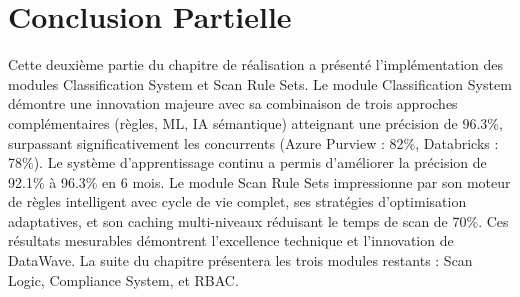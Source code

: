 \section*{Conclusion Partielle}

Cette deuxième partie du chapitre de réalisation a présenté l'implémentation des modules Classification System et Scan Rule Sets. Le module Classification System démontre une innovation majeure avec sa combinaison de trois approches complémentaires (règles, ML, IA sémantique) atteignant une précision de 96.3\%, surpassant significativement les concurrents (Azure Purview : 82\%, Databricks : 78\%). Le système d'apprentissage continu a permis d'améliorer la précision de 92.1\% à 96.3\% en 6 mois. Le module Scan Rule Sets impressionne par son moteur de règles intelligent avec cycle de vie complet, ses stratégies d'optimisation adaptatives, et son caching multi-niveaux réduisant le temps de scan de 70\%. Ces résultats mesurables démontrent l'excellence technique et l'innovation de DataWave. La suite du chapitre présentera les trois modules restants : Scan Logic, Compliance System, et RBAC.
